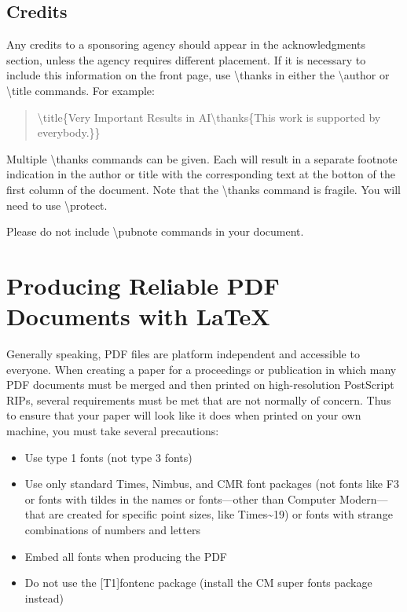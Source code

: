 \documentclass[letterpaper]{article}
\theoremstyle{definition}
\begin{document}
\subsection{Credits}
Any credits to a sponsoring agency should appear in the acknowledgments section, unless the agency requires different placement. If it is necessary to include this information on the front page, use
\textbackslash thanks in either the \textbackslash author or \textbackslash title commands.
For example:
\begin{quote}
\begin{small}
\textbackslash title\{Very Important Results in AI\textbackslash thanks\{This work is
 supported by everybody.\}\}
\end{small}
\end{quote}
Multiple \textbackslash thanks commands can be given. Each will result in a separate footnote indication in the author or title with the corresponding text at the botton of the first column of the document. Note that the \textbackslash thanks command is fragile. You will need to use \textbackslash protect.

Please do not include \textbackslash pubnote commands in your document.






\section{Producing Reliable PDF\\Documents with \LaTeX{}}
Generally speaking, PDF files are platform independent and accessible to everyone. When creating a paper for a proceedings or publication in which many PDF documents must be merged and then printed on high-resolution PostScript RIPs, several requirements must be met that are not normally of concern. Thus to ensure that your paper will look like it does when printed on your own machine, you must take several precautions:
\begin{itemize}
\item Use type 1 fonts (not type 3 fonts)
\item Use only standard Times, Nimbus, and CMR font packages (not fonts like F3 or fonts with tildes in the names or fonts---other than Computer Modern---that are created for specific point sizes, like Times\~{}19) or fonts with strange combinations of numbers and letters
\item Embed all fonts when producing the PDF
\item Do not use the [T1]{fontenc} package (install the CM super fonts package instead)
\end{itemize}
\end{document}
